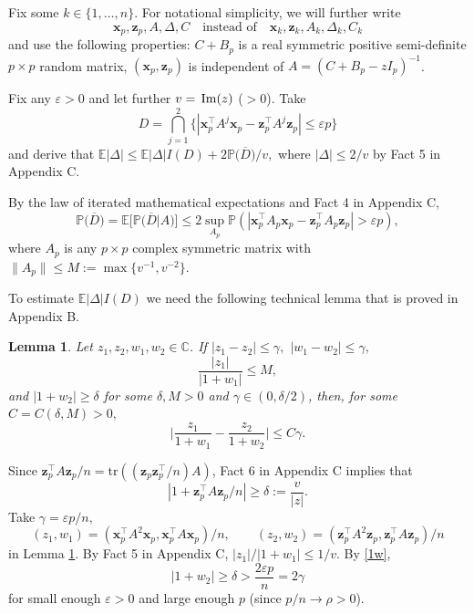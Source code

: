 \documentclass[12pt, a4paper]{article}
\newcommand\x{\mathbf x}
\renewcommand\Im{{\rm\,Im} }
\newcommand\z{{\mathbf z}}
\newcommand\e{{\mathbb E}}
\newcommand\p{{\mathbb P}}
\newcommand\tr{{\mathrm{tr}}}
\newtheorem{lemma}[theorem]{Lemma}%
\begin{document}
Fix some $k\in\{1,\ldots,n\}$. For notational simplicity, we will further write \[\x_p,\z_p,A,\Delta,C\quad \text{instead of}\quad \x_{k},\z_k,A_{k},\Delta_{k},C_{k}\] and use the following properties:   $C+B_p$ is a real symmetric positive semi-definite $p\times p$ random matrix, $(\x_p,\z_p)$ is independent of $A=(C+B_p-zI_p)^{-1}$. 

Fix any $\varepsilon>0$ and let further $v=\Im(z)$ ($ >0$). Take
\[D=\bigcap_{j=1}^2\{|\x_p^\top A^j \x_p-\z_p^\top A^j \z_p|\leqslant \varepsilon p\}\]  
 and derive that $\e |\Delta|\leqslant \e|\Delta|I(D)+2\p\big(\overline{D}\big)/v,$ where    $|\Delta|\leqslant 2/v$ by Fact 5 in Appendix C. 

 
By the law of iterated mathematical expectations and Fact 4 in Appendix C,
\[\p\big(\overline{D}\big)=\e\big[\p\big(\overline{D}|A\big)\big]\leqslant 2\sup_{A_p}\p(|\x_p^\top  A_p \x_p-\z_p^\top A_p \z_p|>\varepsilon  p),\]
where $ A_p$ is any  $p\times p$ complex symmetric matrix  with $\|A_p\|\leqslant M:=\max\{v^{-1},v^{-2}\}$. 

To estimate $\e|\Delta|I(D)$ we need the following technical lemma that is proved in Appendix B.
\begin{lemma} \label{l3} Let $z_1,z_2,w_1,w_2\in\mathbb C$. If $|z_1-z_2|\leqslant \gamma,$ $|w_1-w_2|\leqslant \gamma,$
\[\frac{|z_1|}{|1+w_1|}\leqslant M,\] and $|1+w_2|\geqslant\delta$ for some $\delta,M>0$ and $\gamma\in(0,\delta/2)$, then, 
for some $C=C(\delta,M)>0,$ 
\[\Big|\frac{z_1}{1+w_1}-\frac{z_2}{1+w_2}\Big|\leqslant C\gamma.\]
\end{lemma}

Since $\z_p^\top A\z_p/n=\tr((\z_p\z_p^\top/n) A)$,  Fact 6 in Appendix C implies that
\begin{equation}\label{1w}
|1+\z_p^\top A\z_p/n|\geqslant \delta:=\frac{v}{|z|}.
\end{equation}
Take $\gamma=\varepsilon p/n,$
\[(z_1,w_1)=(\x_p^\top A^2 \x_p, \x_p^\top A \x_p)/n,\qquad 
(z_2,w_2)=(\z_p^\top A^2 \z_p, \z_p^\top A \z_p)/n\]
in Lemma \ref{l3}. By Fact 5 in Appendix C, $ |z_1|/|1+w_1| \leqslant 1/ v .$
By \eqref{1w}, 
\[|1+w_2|\geqslant \delta>\frac{2\varepsilon p}n=2\gamma\]
for small enough $\varepsilon>0$ and large enough $p$ (since $p/n\to \rho>0$).
\end{document}
